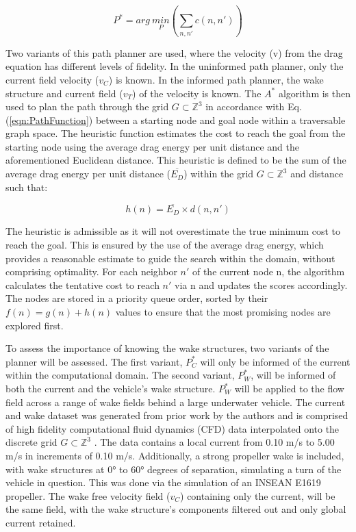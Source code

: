 \documentclass[final,5p,times,twocolumn]{elsarticle}
\begin{document}
\begin{equation}
    \label{eqn:PathFunction}
    P^* = arg \ \underset{P}{min} \left ( \sum_{n, n'}^{} c(n, n') \right )
\end{equation}

Two variants of this path planner are used, where the velocity (v) from the drag equation has different levels of fidelity. In the uninformed path planner, only the current field velocity ($v_C$) is known. In the informed path planner, the wake structure and current field ($v_T$) of the velocity is known. The $A^*$ algorithm is then used to plan the path through the grid $G \subset \mathbb{Z}^{3}$ in accordance with Eq. (\ref{eqn:PathFunction}) between a starting node and goal node within a traversable graph space. The heuristic function estimates the cost to reach the goal from the starting node using the average drag energy per unit distance and the aforementioned Euclidean distance. This heuristic is defined to be the sum of the average drag energy per unit distance ($\overline{E_D}$) within the grid $G \subset \mathbb{Z}^{3}$ and distance such that:

\begin{equation}
    \label{eqn:SearchHeuristic}
    h(n) = \overline{E_D} \times d(n, n')
\end{equation}

The heuristic is admissible as it will not overestimate the true minimum cost to reach the goal. This is ensured by the use of the average drag energy, which provides a reasonable estimate to guide the search within the domain, without comprising optimality. For each neighbor $n'$ of the current node n, the algorithm calculates the tentative cost to reach $n'$ via n and updates the scores accordingly. The nodes are stored in a priority queue order, sorted by their $f(n)=g(n)+h(n)$ values to ensure that the most promising nodes are explored first. 

To assess the importance of knowing the wake structures, two variants of the planner will be assessed. The first variant, $P^{*}_C$ will only be informed of the current within the computational domain. The second variant, $P^{*}_W$, will be informed of both the current and the vehicle's wake structure. $P^{*}_W$ will be applied to the flow field across a range of wake fields behind a large underwater vehicle. The current and wake dataset was generated from prior work by the authors and is comprised of high fidelity computational fluid dynamics (CFD) data interpolated onto the discrete grid $G \subset \mathbb{Z}^{3}$ \cite{IEEE} \cite{SUBSTEC}.  The data contains a local current from 0.10 m/s to 5.00 m/s in increments of 0.10 m/s. Additionally, a strong propeller wake is included, with wake structures at 0° to 60° degrees of separation, simulating a turn of the vehicle in question. This was done via the simulation of an INSEAN E1619 propeller. The wake free velocity field ($v_C$) containing only the current, will be the same field, with the wake structure’s components filtered out and only global current retained.
\end{document}
